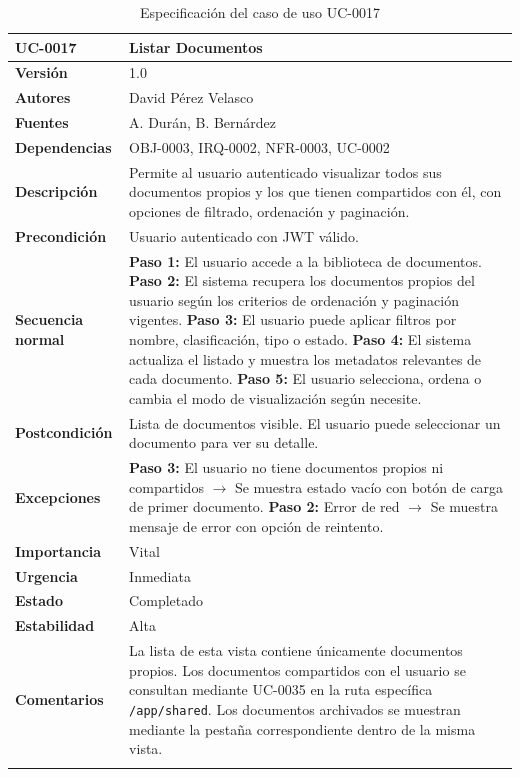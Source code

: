 \documentclass[11pt, a4paper]{article}
\begin{document}
\begin{longtable}{|p{4cm}|p{10cm}|}
\hline
\textbf{UC-0017} & Listar Documentos \\
\hline
\textbf{Versión} & 1.0 \\
\hline
\textbf{Autores} & David Pérez Velasco \\
\hline
\textbf{Fuentes} & A. Durán, B. Bernárdez \\
\hline
\textbf{Dependencias} & OBJ-0003, IRQ-0002, NFR-0003, UC-0002 \\
\hline
\textbf{Descripción} & Permite al usuario autenticado visualizar todos sus documentos propios y los que tienen compartidos con él, con opciones de filtrado, ordenación y paginación. \\
\hline
\textbf{Precondición} & Usuario autenticado con JWT válido. \\
\hline
\textbf{Secuencia normal} &
\textbf{Paso 1:} El usuario accede a la biblioteca de documentos.\newline
\textbf{Paso 2:} El sistema recupera los documentos propios del usuario según los criterios de ordenación y paginación vigentes.\newline
\textbf{Paso 3:} El usuario puede aplicar filtros por nombre, clasificación, tipo o estado.\newline
\textbf{Paso 4:} El sistema actualiza el listado y muestra los metadatos relevantes de cada documento.\newline
\textbf{Paso 5:} El usuario selecciona, ordena o cambia el modo de visualización según necesite.\\
\hline
\textbf{Postcondición} & Lista de documentos visible. El usuario puede seleccionar un documento para ver su detalle. \\
\hline
\textbf{Excepciones} &
\textbf{Paso 3:} El usuario no tiene documentos propios ni compartidos $\rightarrow$ Se muestra estado vacío con botón de carga de primer documento.\newline
\textbf{Paso 2:} Error de red $\rightarrow$ Se muestra mensaje de error con opción de reintento.\\
\hline
\textbf{Importancia} & Vital \\
\hline
\textbf{Urgencia} & Inmediata \\
\hline
\textbf{Estado} & Completado \\
\hline
\textbf{Estabilidad} & Alta \\
\hline
\textbf{Comentarios} & La lista de esta vista contiene únicamente documentos propios. Los documentos compartidos con el usuario se consultan mediante UC-0035 en la ruta específica \texttt{/app/shared}. Los documentos archivados se muestran mediante la pestaña correspondiente dentro de la misma vista. \\
\hline
\caption{Especificación del caso de uso UC-0017}
\end{longtable}
\end{document}
